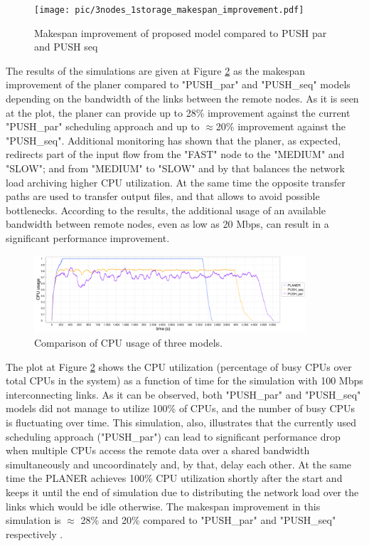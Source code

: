 \documentclass{svjour3}                     %
\begin{document}
\begin{figure}[h]
  \begin{center}
    \texttt{[image: pic/3nodes\_1storage\_makespan\_improvement.pdf]}
    \caption{Makespan improvement of proposed model compared to PUSH par and PUSH seq}
      \label{multi_makespan_compare}	
  \end{center}  
\end{figure}

The results of the simulations are given at Figure \ref{multi_cpu_consumption} as the makespan improvement of the planer compared to "PUSH\_par" and "PUSH\_seq" models depending on the bandwidth of the links between the remote nodes. As it is seen at the plot, the planer can provide up to 28\% improvement against the current "PUSH\_par" scheduling approach and up to $\approx$20\% improvement against the "PUSH\_seq". Additional monitoring has shown that the planer, as expected, redirects part of the input flow from the "FAST" node to the "MEDIUM" and "SLOW"; and from "MEDIUM" to "SLOW" and by that balances the network load archiving higher CPU utilization. At the same time the opposite transfer paths are used to transfer output files, and that allows to avoid possible bottlenecks. According to the results, the additional usage of an available bandwidth between remote nodes, even as low as 20 Mbps, can result in a significant performance improvement.

\begin{figure}[h]
  \begin{center}
    \includegraphics [trim= 0mm 00mm 0mm 00mm , clip,width=0.9\textwidth]{pic/3models_link01.png}
    \caption{Comparison of CPU usage of three models. }
      \label{multi_cpu_consumption}	
  \end{center}  
\end{figure}

The plot at Figure \ref{multi_cpu_consumption} shows the CPU utilization (percentage of busy CPUs over total CPUs in the system) as a function of time for the simulation with 100 Mbps interconnecting links. As it can be observed, both "PUSH\_par" and "PUSH\_seq" models did not manage to utilize 100\% of CPUs, and the number of busy CPUs is fluctuating over time. This simulation, also, illustrates that the currently used scheduling approach ("PUSH\_par") can lead to significant performance drop when multiple CPUs access the remote data over a shared bandwidth simultaneously and uncoordinately and, by that, delay each other. At the same time the PLANER achieves 100\% CPU utilization shortly after the start and keeps it until the end of simulation due to distributing the network load over the links which would be idle otherwise. The makespan improvement in this simulation is $\approx$ 28\% and 20\% compared to "PUSH\_par" and "PUSH\_seq" respectively .
\end{document}
